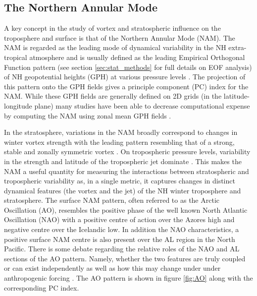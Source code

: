 \subsection{The Northern Annular Mode}
\label{sec:NAM}

A key concept in the study of vortex and stratospheric influence on the troposphere and surface is that of the Northern Annular Mode (NAM). The NAM is regarded as the leading mode of dynamical variability in the NH extra-tropical atmosphere \citep{thompsonArctic1998, thompsonAnnular2000, baldwinPropagation1999} and is usually defined as the leading Empirical Orthogonal Function pattern (see section \ref{sec:stat_methods} for full details on EOF analysis) of NH geopotential heights (GPH) at various pressure levels \citep{baldwinPropagation1999}. The projection of this pattern onto the GPH fields gives a principle component (PC) index for the NAM. While these GPH fields are generally defined on 2D grids (in the latitude-longitude plane) many studies have been able to decrease computational expense by computing the NAM using zonal mean GPH fields \citep{baldwinCritical2009}. 

In the stratosphere, variations in the NAM broadly correspond to changes in winter vortex strength with the leading pattern resembling that of a strong, stable and zonally symmetric vortex \citep{baldwinPropagation1999}. On tropospheric pressure levels, variability in the strength and latitude of the tropospheric jet dominate \citep{limpasuvanEddies1999}. This makes the NAM a useful quantity for measuring the interactions between stratospheric and tropospheric variability as, in a single metric, it captures changes in distinct dynamical features (the vortex and the jet) of the NH winter troposphere and stratosphere. The surface NAM pattern, often referred to as the Arctic Oscillation (AO), resembles the positive phase of the well known North Atlantic Oscillation  (NAO) \citep{hurrellNorth2003c} with a positive centre of action over the Azores high and negative centre over the Icelandic low. In addition the NAO characteristics, a positive surface NAM centre is also present over the AL region in the North Pacific. There is some debate regarding the relative roles of the NAO and AL sections of the AO pattern. Namely, whether the two features are truly coupled or can exist independently \citep{deserTeleconnectivity2000, ambaumArctic2001} as well as how this may change under under anthropogenic forcing \citep{hamoudaDecoupling2021}. The AO pattern is shown in figure \ref{fig:AO} along with the corresponding PC index.

